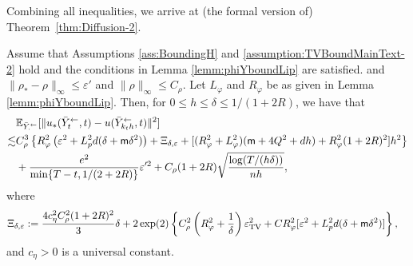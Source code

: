 Combining all inequalities, we arrive at (the formal version of) Theorem~\ref{thm:Diffusion-2}. 
\begin{thm} \label{thm:ustaruDiffFinal}
Assume that Assumptions \ref{ass:BoundingH} and \ref{assumption:TVBoundMainText-2} hold 
and the conditions in Lemma \ref{lemm:phiYboundLip} are satisfied. 
and $\|\rho_* - \rho\|_\infty \leq \varepsilon'$ and $\|\rho\|_\infty \leq C_\rho$. 
Let $L_\varphi$ and $R_\varphi$ be as given in Lemma \ref{lemm:phiYboundLip}.
Then, for $0 \leq h \leq \delta \leq 1/(1 + 2R)$, we have that 
\begin{align}
& \mathbb{E}_{\bar{Y}_{\cdot}^{\leftarrow}}[ \|u_*(\bar{Y}_{t}^\leftarrow,t) -  u(\bar{Y}_{k_t h}^\leftarrow,t) \|^2]  \\
\lesssim & 
C_\rho^3 \left\{ R_\varphi^2 \left(\varepsilon^2+ L_p^2 d(\delta + \mathsf{m} \delta^2) \right)
+ \Xi_{\delta,\varepsilon}
+
[ (R_\varphi^2 + L_\varphi^2) (\mathsf{m} + 4Q^2 + d h)  
+ R_\varphi^2  (1 + 2R)^2] h^2\right\} \\
& +  \frac{e^2}{\min\{T-t,1/(2+2R)\}} \varepsilon'^2 +  C_\rho (1 + 2R) \sqrt{\frac{\log(T/(h\delta))}{n h}}, 
\end{align}
where 
\begin{align}
\Xi_{\delta,\varepsilon} & := \frac{4 c_\eta^2  C_\rho^2 (1+2R)^2}{3}\delta  
+ 2 \exp(2)
\left\{ C_\rho^2 \left(R_\varphi^2 + \frac{1}{\delta}\right)\varepsilon_{\mathrm{TV}}^2 + C R_\varphi^2  [\varepsilon^2 + L_p^2 d(\delta + \mathsf{m} \delta^2)]\right\},
\end{align} 
and $c_\eta > 0$ is a universal constant. 
\end{thm}

